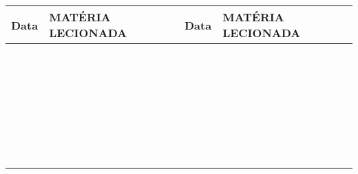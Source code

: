 \vspace{0.25cm}

\begin{small}
    \begin{tabular}{|l|l|l|l|}
       \hline
       \textbf{Data} & \hspace{2.25cm} \textbf{MAT\'ERIA LECIONADA} \hspace{2.25cm} &
       \textbf{Data} & \hspace{2.25cm} \textbf{MAT\'ERIA LECIONADA} \hspace{2.25cm} \\
       \hline
       &&& \\
       \hline
       &&& \\
       \hline
       &&& \\
       \hline
       &&& \\
       \hline
       &&& \\
       \hline
       &&& \\
       \hline
       &&& \\
       \hline
       &&& \\
       \hline
       &&& \\
       \hline
       &&& \\
       \hline
       &&& \\
       \hline
       &&& \\
       \hline
       &&& \\
       \hline
       &&& \\
       \hline
       &&& \\
       \hline
       &&& \\
       \hline
       &&& \\
       \hline
       &&& \\
       \hline
       &&& \\
       \hline
       &&& \\
       \hline
       &&& \\
       \hline
       &&& \\
       \hline
       &&& \\
       \hline
       &&& \\
       \hline
       &&& \\
       \hline
       &&& \\
       \hline
       &&& \\
       \hline
       &&& \\
       \hline
       &&& \\
       \hline
       &&& \\

\end{tabular}
\end{small}

